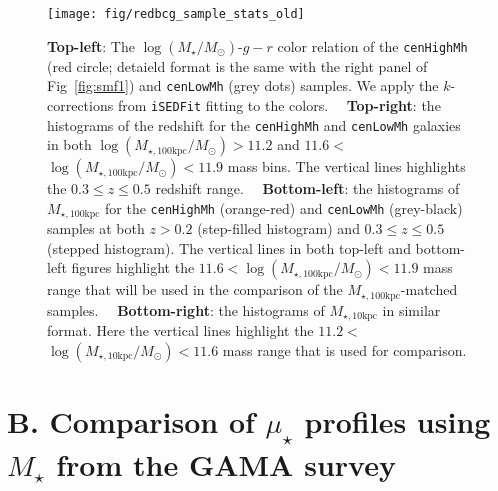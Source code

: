 \documentclass[a4paper,fleqn,usenatbib]{mnras}
\def\rbcg{\texttt{cenHighMh}}
\def\nbcg{\texttt{cenLowMh}}
\def\mstar{{$M_{\star}$}}
\def\logms{{$\log (M_{\star}/M_{\odot})$}}
\def\minn{{$M_{\star,10\mathrm{kpc}}$}}
\def\mtot{{$M_{\star,100\mathrm{kpc}}$}}
\def\logminn{{$\log (M_{\star,10\mathrm{kpc}}/M_{\odot})$}}
\def\logmtot{{$\log (M_{\star,100\mathrm{kpc}}/M_{\odot})$}}
\def\mden{{$\mu_{\star}$}}
\begin{document}
  \begin{figure}
      \centering 
      \texttt{[image: fig/redbcg\_sample\_stats\_old]}
      \caption{
          \textbf{Top-left}: The \logms{}-$g-r$ color relation of the \rbcg{} 
          (red circle; detaield format is the same with the right panel of 
          Fig~\ref{fig:smf1}) and \nbcg{} (grey dots) samples.
          We apply the $k$-corrections from \texttt{iSEDFit} fitting to the colors.~~          
          \textbf{Top-right}: the histograms of the redshift for the \rbcg{} and 
          \nbcg{} galaxies in both \logmtot$>11.2$ and $11.6<$\logmtot{}$<11.9$
          mass bins.
          The vertical lines highlights the $0.3\leq z \leq 0.5$ redshift range.~~
          \textbf{Bottom-left}: the histograms of \mtot{} for the \rbcg{} (orange-red) 
          and \nbcg{} (grey-black) samples at both $z>0.2$ (step-filled histogram) and 
          $0.3 \leq z \leq 0.5$ (stepped histogram). 
          The vertical lines in both top-left and bottom-left figures highlight the 
          $11.6<$\logmtot{}$<11.9$ mass range that will be used in the comparison of 
          the \mtot{}-matched samples.~~
          \textbf{Bottom-right}: the histograms of \minn{} in similar format. 
          Here the vertical lines highlight the 
          $11.2<$\logminn{}$<11.6$ mass range that is used for comparison.
      }
      \label{fig:sample_stats}
  \end{figure}
    
\section{B. Comparison of \mden{} profiles using \mstar{} from the GAMA survey}
    \label{app:gama} 
\end{document}
